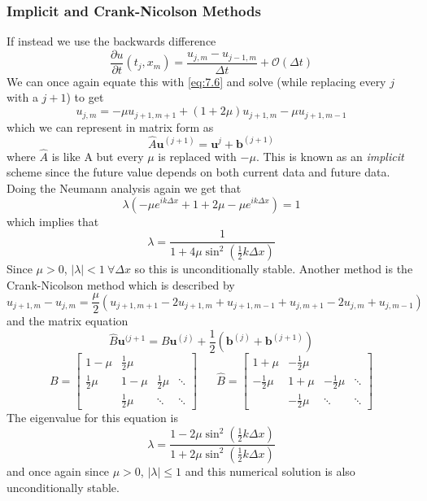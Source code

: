 \documentclass{article}
\newcommand{\pd}[2]{\frac{\partial #1}{\partial #2}}
\newcommand{\vb}[1]{\mathbf{ #1}}
\newcommand{\twen}{\hspace{20pt}}
\numberwithin{equation}{section}
\begin{document}
\subsubsection{Implicit and Crank-Nicolson Methods}
If instead we use the backwards difference 
\begin{equation*}
    \pd{u}{t}(t_j,x_m) = \frac{u_{j,m}-u_{j-1,m}}{\Delta t} + \mathcal{O}(\Delta t)
\end{equation*}
We can once again equate this with \eqref{eq:7.6} and solve (while replacing every $j$ with a $j+1$) to get 
\begin{equation*}
    u_{j,m} = -\mu u_{j+1,m+1} + (1+2\mu)u_{j+1,m} - \mu u_{j+1,m-1}
\end{equation*}
which we can represent in matrix form as 
\begin{equation}
    \hat A \vb{u}^{(j+1)} = \vb{u}^{j}+\vb{b}^{(j+1)}
\end{equation}
where $\hat A$ is like A but every $\mu$ is replaced with $-\mu$. This is known as an \emph{implicit} scheme since the future value depends on both current data and future data. Doing the Neumann analysis again we get that 
\begin{equation*}
    \lambda (-\mu e^{ik\Delta x}+1+2\mu -\mu e^{ik\Delta x}) = 1 
\end{equation*}
which implies that 
\begin{equation*}
    \lambda = \frac{1}{1+4\mu \sin^2(\frac{1}{2}k\Delta x)}
\end{equation*}
Since $\mu >0$,  $|\lambda|<1 \ \forall\Delta x$ so this is unconditionally stable. Another method is the Crank-Nicolson method which is described by 
\begin{equation*}
    u_{j+1,m}-u_{j,m}=\frac{\mu }{2}(u_{j+1,m+1}-2u_{j+1,m} + u_{j+1,m-1} + u_{j,m+1} -2u_{j,m} +u_{j,m-1})
\end{equation*}
and the matrix equation 
\begin{equation*}
    \hat B \vb{u}^{(j+1} = B\vb{u}^{(j)} + \frac{1}{2}(\vb{b}^{(j)} + \vb{b}^{(j+1)})
\end{equation*}
\begin{equation*}
    B = \begin{bmatrix}
        1-\mu &\frac{1}{2}\mu\\ \frac{1}{2}\mu&1-\mu&\frac{1}{2}\mu &\ddots\\&\frac{1}{2}\mu &\ddots & \ddots
    \end{bmatrix} 
    \twen \hat B =\begin{bmatrix}
        1+\mu &-\frac{1}{2}\mu\\ -\frac{1}{2}\mu&1+\mu&-\frac{1}{2}\mu &\ddots\\&-\frac{1}{2}\mu &\ddots & \ddots
    \end{bmatrix} 
\end{equation*}
The eigenvalue for this equation is 
\begin{equation*}
    \lambda = \frac{1-2\mu \sin^2(\frac{1}{2}k\Delta x)}{1+2\mu \sin^2(\frac{1}{2}k\Delta x)}
\end{equation*}
and once again since $\mu>0$, $|\lambda |\leq1$ and this numerical solution is also unconditionally stable.
\end{document}
